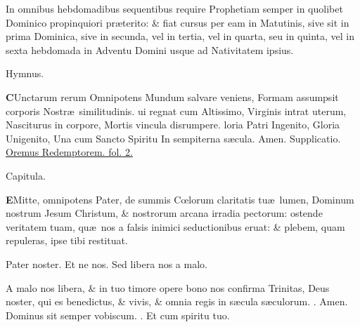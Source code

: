 \documentclass[letter,11pt]{book}
\makeatletter
\DeclareRobustCommand{\Rbar}{\vers@resp{0pt}{R}}
\newcommand{\vers@resp@sym}{\raisebox{0.2ex}{\rotatebox[origin=c]{-20}{$\m@th\rceil$}}}
\newcommand{\vers@resp}[2]{%
  {\ooalign{\hidewidth\kern#1\vers@resp@sym\hidewidth\cr#2\cr}}%
}%
\def\R{\color{Red} \Rbar . \color{black}}
\makeatother
\begin{document}
\begin{multicols}{2}
\par \color{Red} In omnibus hebdomadibus sequentibus require Prophetiam semper in quolibet Dominico propinquiori pr\ae terito: \& fiat cursus per eam in Matutinis, sive sit in prima Dominica, sive in secunda, vel in tertia, vel in quarta, seu in quinta, vel in sexta hebdomada in Adventu Domini usque ad Nativitatem ipsius. \color{black}
\vspace{-.75em} \begin{center} \color{Red} Hymnus. \end{center} \vspace{-.75em}
\lettrine[lines=2]{\bfseries \color{Red} C}{}Unctarum rerum Omnipotens
\newline Mundum salvare veniens,
\newline \indent Formam assumpsit corporis
\newline \indent Nostr\ae \ similitudinis.
ui regnat cum Altissimo,
\newline \indent Virginis intrat uterum,
\newline \indent Nasciturus in corpore,
\newline \indent Mortis vincula disrumpere.
loria Patri Ingenito,
\newline \indent Gloria Unigenito,
\newline \indent Una cum Sancto Spiritu
\newline \indent In sempiterna s\ae cula. Amen.
\newline \color{Red} Supplicatio. \color{black} \hyperlink{Supplicatio}{Oremus Redemptorem. {\color{Red} fol.} 2.}
\vspace{-.75em} \begin{center} \color{Red} Capitula. \end{center} \vspace{-.75em}
\lettrine[lines=2]{\bfseries \color{Red} E}{}Mitte, omnipotens Pater, de summis C\oe lorum claritatis tu\ae \ lumen, Dominum nostrum Jesum Christum, \& nostrorum arcana irradia pectorum: ostende veritatem tuam, qu\ae \ nos a falsis inimici seductionibus eruat: \& plebem, quam repuleras, ipse tibi restituat.
\par Pater noster. Et ne nos. Sed libera nos a malo.
\par A malo nos libera, \& in tuo timore opere bono nos confirma Trinitas, Deus noster, qui es benedictus, \& vivis, \& omnia regis in s\ae cula s\ae culorum. \R Amen. Dominus sit semper vobiscum. \R Et cum spiritu tuo.

\end{multicols}
\end{document}
